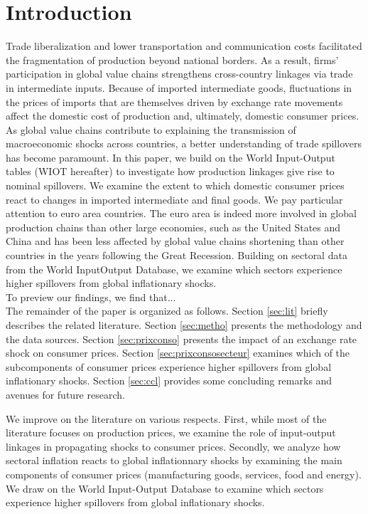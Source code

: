 \documentclass[11pt,a4paper]{article}
\begin{document}
\section{Introduction}
Trade liberalization and lower transportation and communication costs facilitated the fragmentation of production beyond national borders. As a result, firms' participation in global value chains strengthens cross-country linkages via trade in intermediate inputs. 
Because of imported intermediate goods, fluctuations in the prices of imports that are themselves driven by exchange rate movements affect the domestic cost of production and, ultimately, domestic consumer prices. 
As global value chains contribute to explaining the transmission of macroeconomic shocks across countries, a better understanding of trade spillovers has become paramount.  
In this paper, we build on the World Input-Output tables (WIOT hereafter) to investigate how production linkages give rise to nominal spillovers. 
We examine the extent to which domestic consumer prices react to changes in imported intermediate and final goods.
We pay particular attention to euro area countries. The euro area is indeed more involved in global production chains than other large economies, such as the United States and China \citep{ECB2016} and has been less affected by global value chains shortening than other countries in the years following the Great Recession. 
Building on sectoral data from the World InputOutput Database, we examine which sectors experience higher spillovers from global inflationary shocks.\\
To preview our findings, we find that...\\
The remainder of the paper is organized as follows. Section \ref{sec:lit} briefly describes the related literature. Section \ref{sec:metho} presents the methodology and the data sources.  Section \ref{sec:prixconso} presents the impact of an exchange rate shock on consumer prices.  Section \ref{sec:prixconsosecteur} examines which of the subcomponents of consumer prices experience higher spillovers from global inflationary shocks.
Section \ref{sec:ccl} provides some concluding remarks and avenues for future research.




We improve on the literature on various respects. First, while most of the literature focuses on production prices, we examine the role of input-output linkages in propagating shocks to consumer prices. 
Secondly, we analyze how sectoral inflation reacts to global inflationnary shocks by examining the main components of consumer prices (manufacturing goods, services, food and energy).  We draw on the World Input-Output Database to examine which sectors experience higher spillovers from global inflationary shocks.
\end{document}
